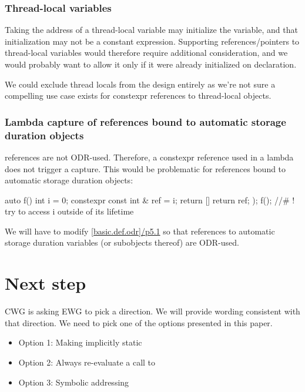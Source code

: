 \documentclass{wg21}
\begin{document}
\subsubsection{Thread-local variables}

Taking the address of a thread-local variable may initialize the variable, and that initialization may not be a constant expression.
Supporting references/pointers to thread-local variables would therefore require additional consideration, and we would probably want to allow it only if it were  already initialized
on declaration.

We could exclude thread locals from the design entirely as we're not sure a compelling use case exists for constexpr references to thread-local objects.

\subsubsection{Lambda capture of  references bound to automatic storage duration objects}

 references are not ODR-used.  Therefore, a constexpr reference used in a lambda does not trigger a capture.
This would be problematic for references bound to automatic storage duration objects:

\begin{colorblock}
auto f() {
    int i = 0;
    constexpr const int & ref = i;
    return [] {
        return ref;
    });
}
f(); //# ! try to access i outside of its lifetime
\end{colorblock}

We will have to modify \href{http://eel.is/c++draft/basic.def.odr#5.1}{[basic.def.odr]/p5.1} so that  references to automatic storage duration variables (or subobjects thereof) are ODR-used.

\section{Next step}

CWG is asking EWG to pick a direction. We will provide wording consistent with that direction.
We need to pick one of the options presented in this paper.

\begin{itemize}
\item Option 1: Making  implicitly static
\item Option 2: Always re-evaluate a call to 
\item Option 3: Symbolic addressing
\end{itemize}
\end{document}
